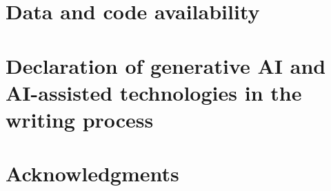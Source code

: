 \documentclass[preprint,12pt]{elsarticle}
\begin{document}
\section*{Data and code availability}\label{sec:availability}
\AvailabilityText

\section*{Declaration of generative AI and AI-assisted technologies in the writing process}
\AIText

\section*{Acknowledgments}
\AckText




\appendix

\end{document}
